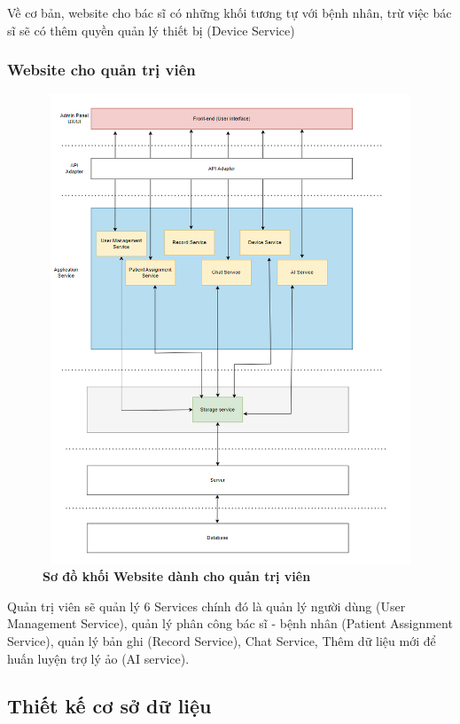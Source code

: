 Về cơ bản, website cho bác sĩ có những khối tương tự với bệnh nhân, trừ việc bác sĩ sẽ có thêm quyền quản lý thiết bị (Device Service)

\subsubsection{Website cho quản trị viên}

\begin{figure}[H]
  \centering
  \includegraphics[width=12cm,height=14cm]{Images/system/fmECG_architecture-Admin.drawio.png}
  \caption[Sơ đồ khối Website dành cho quản trị viên]{\bfseries \fontsize{12pt}{0pt}\selectfont Sơ đồ khối Website dành cho quản trị viên}
  \label{fmECG_architecture-Admin} %
\end{figure}

Quản trị viên sẽ quản lý 6 Services chính đó là quản lý người dùng (User Management Service), quản lý phân công
bác sĩ - bệnh nhân (Patient Assignment Service), quản lý bản ghi (Record Service), Chat Service, Thêm dữ liệu mới để huấn luyện trợ lý ảo (AI service).
 
\newpage

\subsection{Thiết kế cơ sở dữ liệu}
\label{design_database}
